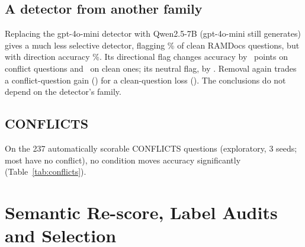 \subsection{A detector from another family}
Replacing the gpt-4o-mini detector with Qwen2.5-7B (gpt-4o-mini still generates) gives a much less selective
detector, flagging \qdetFpr\% of clean RAMDocs questions, but with direction accuracy \qdetDir\%. Its directional
flag changes accuracy by \zQDetLlmDirFlagDirectionalConflict\ points on conflict questions and \zQDetLlmDirFlagDirectionalClean\ on
clean ones; its neutral flag, by \zQDetLlmDirFlagConflict. Removal again trades a conflict-question gain
(\zQDetLlmDirRemoveSuspectConflict) for a clean-question loss (\zQDetLlmDirRemoveSuspectClean). The conclusions do
not depend on the detector's family.

\subsection{CONFLICTS}
On the 237 automatically scorable CONFLICTS questions (exploratory, 3 seeds; most have no conflict), no condition
moves accuracy significantly (Table~\ref{tab:conflicts}).

\section{Semantic Re-score, Label Audits and Selection}
\label{app:semantic}

